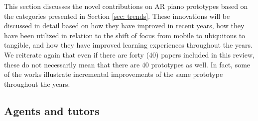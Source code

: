 \documentclass[manuscript,screen]{acmart}
\begin{document}
This section discusses the novel contributions on AR piano prototypes based on the categories presented in Section \ref{sec: trends}. These innovations will be discussed in detail based on how they have improved in recent years, how they have been utilized in relation to the shift of focus from mobile to ubiquitous to tangible, and how they have improved learning experiences throughout the years. We reiterate again that even if there are forty (40) papers included in this review, these do not necessarily mean that there are 40 prototypes as well. In fact, some of the works illustrate incremental improvements of the same prototype throughout the years. 

\subsection{Agents and tutors}
\label{subsec: agent}
\end{document}
